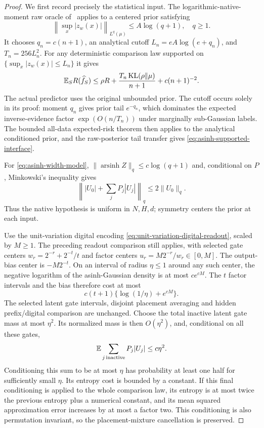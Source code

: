 \begin{proof}
We first record precisely the statistical input.  The logarithmic-native-
moment raw oracle of~\cite{rawprior} applies to a centered prior satisfying
\[
 \left\|\sup_x|z_w(x)|\right\|_{L^q(\mu)}\le A\log(q+1),\quad q\ge1.
\]
It chooses $q_n=c(n+1)$, an analytical cutoff
$L_n=eA\log(e+q_n)$, and $T_n=256L_n^2$.
For any deterministic comparison law supported on
$\{\sup_x|z_w(x)|\le L_n\}$ it gives
\begin{equation}\label{eq:asinh-supported-interface}
 \mathbb E_S R(\widehat f_S)
 \le \rho R+\frac{T_n\operatorname{KL}(\rho\|\mu)}{n+1}+c(n+1)^{-2}.
\end{equation}
The actual predictor uses the original unbounded prior.  The cutoff
occurs solely in its proof: moment $q_n$ gives prior tail $e^{-q_n}$,
which dominates the expected inverse-evidence factor
$\exp(O(n/T_n))$ under marginally sub-Gaussian labels.  The bounded
all-data expected-risk theorem then applies to the analytical
conditioned prior, and the raw-posterior tail transfer gives
\eqref{eq:asinh-supported-interface}.

For \eqref{eq:asinh-width-model},
$\|\operatorname{arsinh}Z\|_q\le c\log(q+1)$ and, conditional on $P$,
Minkowski's inequality gives
\[
 \left\||U_0|+\sum_jP_j|U_j|\right\|_q
       \le2\|U_0\|_q.
\]
Thus the native hypothesis is uniform in $N,H,d$; symmetry centers the
prior at each input.

Use the unit-variation digital encoding
\eqref{eq:unit-variation-digital-readout}, scaled by $M\ge1$.
The preceding readout comparison still applies, with selected gate
centers $w_r=2^{-r}+2^{-t}/t$ and factor centers
$u_r=M2^{-r}/w_r\in[0,M]$.  The output-bias center is $-M2^{-t}$.
On an interval of radius $\eta\le1$ around any such center, the negative
logarithm of the asinh-Gaussian density is at most $ce^{cM}$.
The $t$ factor intervals and the bias therefore cost at most
\[
 c(t+1)\{\log(1/\eta)+e^{cM}\}.
\]
The selected latent gate intervals, disjoint placement averaging and
hidden prefix/digital comparison are unchanged.  Choose the total
inactive latent gate mass at most $\eta^2$.  Its normalized mass is
then $O(\eta^2)$, and, conditional on all these gates,
\[
 \mathbb E\sum_{j\,\mathrm{inactive}}P_j|U_j|\le c\eta^2.
\]
Conditioning this sum to be at most $\eta$ has probability at least
one half for sufficiently small $\eta$.  Its entropy cost is bounded
by a constant.  If this final conditioning is applied to the whole
comparison law, its entropy is at most twice the previous entropy plus
a numerical constant, and its mean squared approximation error
increases by at most a factor two.  This conditioning is also
permutation invariant, so the placement-mixture cancellation is
preserved.


\end{proof}
